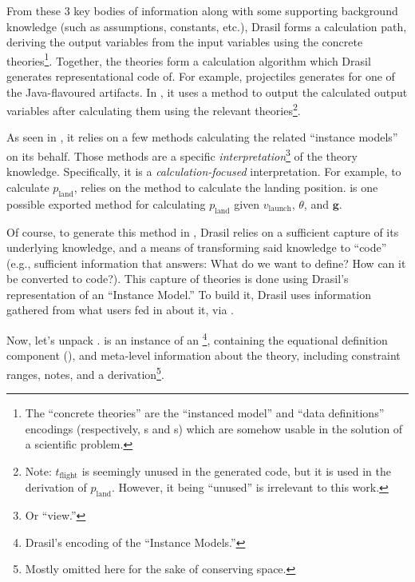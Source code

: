 From these 3 key bodies of information along with some supporting background
knowledge (such as assumptions, constants, etc.), Drasil forms a calculation
path, deriving the output variables from the input variables using the concrete
theories\footnote{The ``concrete theories'' are the ``instanced model'' and
    ``data definitions'' \cite{SmithAndLai2005} encodings (respectively,
    \InstanceModel{}s and \DataDefinition{}s) which are somehow usable in the
    solution of a scientific problem.}. Together, the theories form a calculation
algorithm which Drasil generates representational code of. For example,
\acsp{projectile} generates  for one of the
Java-flavoured artifacts. In , it uses a
 method to output the calculated output variables
after calculating them using the relevant theories\footnote{Note:
    \(t_\text{flight}\) is seemingly unused in the generated code, but it is used in
    the derivation of \(p_\text{land}\). However, it being ``unused'' is irrelevant
    to this work.}.

\originalJavaProjectileMain{}

As seen in , it relies on a few methods
calculating the related ``instance models'' on its behalf. Those methods are a
specific \textit{interpretation}\footnote{Or ``view.''} of the theory knowledge.
Specifically, it is a \textit{calculation-focused} interpretation. For example,
to calculate \(p_\text{land}\),  relies on the
method  to calculate the landing position.
 is one possible exported method for
calculating \(p_\text{land}\) given \(v_\text{launch}\), \(\theta\), and
\(\mathbf{g}\).

\originalJavaProjectilePLandMethod{}

Of course, to generate this method in ,
Drasil relies on a sufficient capture of its underlying knowledge, and a means
of transforming said knowledge to ``code'' (e.g., sufficient information that
answers: What do we want to define? How can it be converted to code?). This
capture of theories is done using Drasil's representation of an ``Instance
Model.'' To build it, Drasil uses information gathered from what users fed in
about it, via .

\originalLandPosTheoryDefinition{}

Now, let's unpack .  is
an instance of an \InstanceModel{}\footnote{Drasil's encoding of the ``Instance
    Models.''}, containing the equational definition component
(), and meta-level information about the theory, including
constraint ranges, notes, and a derivation\footnote{Mostly omitted here for the
    sake of conserving space.}.

